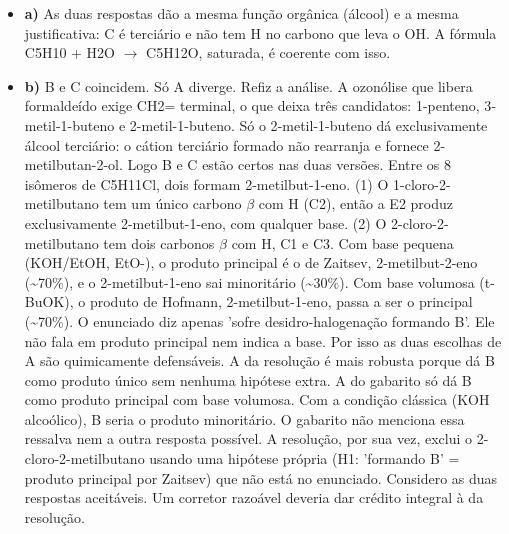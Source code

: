 \documentclass{article}%
\begin{document}
\begin{itemize}%
\item%
\textbf{a)} As duas respostas dão a mesma função orgânica (álcool) e a mesma justificativa: C é terciário e não tem H no carbono que leva o OH. A fórmula C5H10 + H2O $\to$ C5H12O, saturada, é coerente com isso.%
\item%
\textbf{b)} B e C coincidem. Só A diverge. Refiz a análise. A ozonólise que libera formaldeído exige CH2= terminal, o que deixa três candidatos: 1{-}penteno, 3{-}metil{-}1{-}buteno e 2{-}metil{-}1{-}buteno. Só o 2{-}metil{-}1{-}buteno dá exclusivamente álcool terciário: o cátion terciário formado não rearranja e fornece 2{-}metilbutan{-}2{-}ol. Logo B e C estão certos nas duas versões. Entre os 8 isômeros de C5H11Cl, dois formam 2{-}metilbut{-}1{-}eno. (1) O 1{-}cloro{-}2{-}metilbutano tem um único carbono $\beta$ com H (C2), então a E2 produz exclusivamente 2{-}metilbut{-}1{-}eno, com qualquer base. (2) O 2{-}cloro{-}2{-}metilbutano tem dois carbonos $\beta$ com H, C1 e C3. Com base pequena (KOH/EtOH, EtO-), o produto principal é o de Zaitsev, 2{-}metilbut{-}2{-}eno (\textasciitilde{}70\%), e o 2{-}metilbut{-}1{-}eno sai minoritário (\textasciitilde{}30\%). Com base volumosa (t{-}BuOK), o produto de Hofmann, 2{-}metilbut{-}1{-}eno, passa a ser o principal (\textasciitilde{}70\%). O enunciado diz apenas 'sofre desidro{-}halogenação formando B'. Ele não fala em produto principal nem indica a base. Por isso as duas escolhas de A são quimicamente defensáveis. A da resolução é mais robusta porque dá B como produto único sem nenhuma hipótese extra. A do gabarito só dá B como produto principal com base volumosa. Com a condição clássica (KOH alcoólico), B seria o produto minoritário. O gabarito não menciona essa ressalva nem a outra resposta possível. A resolução, por sua vez, exclui o 2{-}cloro{-}2{-}metilbutano usando uma hipótese própria (H1: 'formando B' = produto principal por Zaitsev) que não está no enunciado. Considero as duas respostas aceitáveis. Um corretor razoável deveria dar crédito integral à da resolução.%
\end{itemize}%
\end{document}
